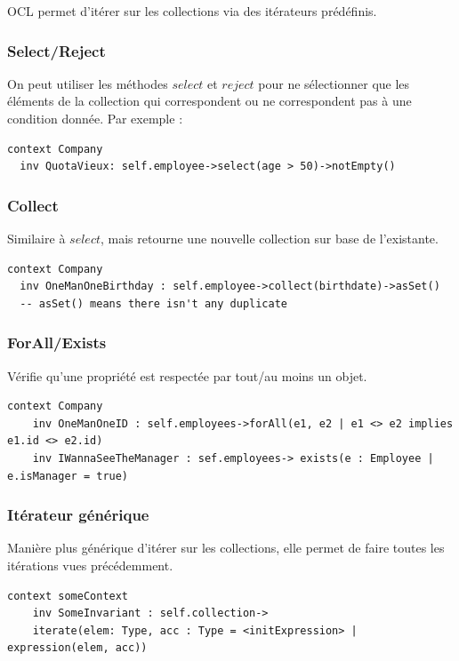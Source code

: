 \documentclass[../Syllabus.tex]{subfiles}
\begin{document}
OCL permet d'itérer sur les collections via des itérateurs prédéfinis.

\subsubsection{Select/Reject}

On peut utiliser les méthodes $select$ et $reject$ pour ne sélectionner que les éléments de la collection qui correspondent ou ne correspondent pas à une condition donnée. Par exemple :

\begin{lstlisting}[language=OCL]
  context Company
  inv QuotaVieux: self.employee->select(age > 50)->notEmpty()
\end{lstlisting}

\subsubsection{Collect}

Similaire à $select$, mais retourne une nouvelle collection sur base de l'existante.

\begin{lstlisting}[language=OCL]
  context Company
  inv OneManOneBirthday : self.employee->collect(birthdate)->asSet()
  -- asSet() means there isn't any duplicate
\end{lstlisting}

\subsubsection{ForAll/Exists}

Vérifie qu'une propriété est respectée par tout/au moins un objet.

\begin{lstlisting}[language=OCL]
  context Company
    inv OneManOneID : self.employees->forAll(e1, e2 | e1 <> e2 implies e1.id <> e2.id)
    inv IWannaSeeTheManager : sef.employees-> exists(e : Employee | e.isManager = true)
\end{lstlisting}

\subsubsection{Itérateur générique}

Manière plus générique d'itérer sur les collections, elle permet de faire toutes les itérations vues précédemment.

\begin{lstlisting}[language=OCL]
  context someContext
    inv SomeInvariant : self.collection->
    iterate(elem: Type, acc : Type = <initExpression> | expression(elem, acc))
\end{lstlisting}
\end{document}
